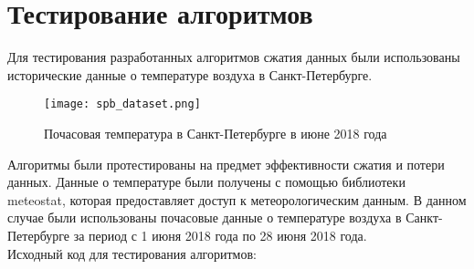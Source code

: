 \chapter{Тестирование алгоритмов}
Для тестирования разработанных алгоритмов сжатия данных были использованы исторические данные о температуре воздуха в Санкт-Петербурге.

\begin{figure}[ht]
    \centering
    \texttt{[image: spb\_dataset.png]}
    \caption{Почасовая температура в Санкт-Петербурге в июне 2018 года}
    \label{fig:spb_dataset}
\end{figure}

Алгоритмы были протестированы на предмет эффективности сжатия и потери данных.
Данные о температуре были получены с помощью библиотеки meteostat, которая предоставляет доступ к метеорологическим данным. В данном случае были использованы почасовые данные о температуре воздуха в Санкт-Петербурге за период с 1 июня 2018 года по 28 июня 2018 года. \\

Исходный код для тестирования алгоритмов:

